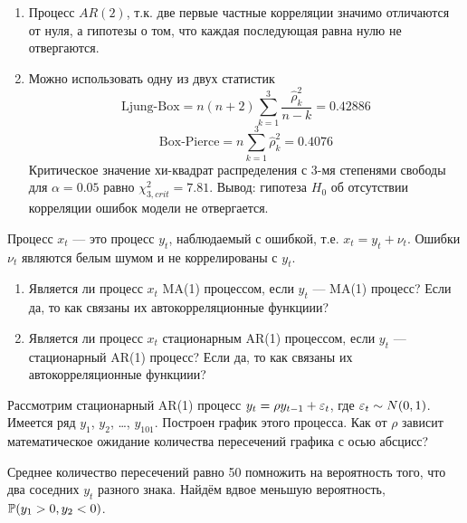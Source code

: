 \begin{problem}
\begin{sol}
\begin{enumerate}
\item Процесс $AR(2)$, т.к. две первые частные корреляции значимо отличаются от нуля, а гипотезы о том, что каждая последующая равна нулю не отвергаются.
\item Можно использовать одну из двух статистик
\[
\text{Ljung-Box}=n(n+2)\sum_{k=1}^3\frac{\hat{\rho}_k^2}{n-k}=
0.42886
\]
\[
\text{Box-Pierce}=n\sum_{k=1}^3\hat{\rho}_k^2=
0.4076
\]
Критическое значение хи-квадрат распределения с 3-мя степенями свободы для $\alpha=0.05$ равно $\chi^2_{3,crit}=7.81$.
Вывод: гипотеза $H_0$ об отсутствии корреляции ошибок модели не отвергается.
\end{enumerate}
\end{sol}
\end{problem}




\begin{problem}
Процесс $x_t$ — это процесс $y_t$, наблюдаемый с ошибкой, т.е. $x_t=y_t+\nu_t$. Ошибки $\nu_t$ являются белым шумом и не коррелированы с $y_t$.
\begin{enumerate}
\item Является ли процесс $x_t$ MA(1) процессом, если $y_t$ —  MA(1) процесс? Если да, то как связаны их автокорреляционные функциии?
\item Является ли процесс $x_t$ стационарным AR(1) процессом, если $y_t$ —  стационарный AR(1) процесс? Если да, то как связаны их автокорреляционные функциии?
\end{enumerate}


\begin{sol}

\end{sol}
\end{problem}


\begin{problem}
Рассмотрим стационарный AR(1) процесс $y_t=\rho y_{t-1} + \e_t$, где $\e_t \sim N(0,1)$. Имеется ряд $y_1$, $y_2$, \ldots, $y_{101}$. Построен график этого процесса. Как от $\rho$ зависит математическое ожидание количества пересечений графика с осью абсцисс?


\begin{sol}
Среднее количество пересечений равно 50 помножить на вероятность того, что два соседних $y_t$ разного знака. Найдём вдвое меньшую вероятность, $\P(y_1>0, y_2 <0)$.
\end{sol}
\end{problem}



